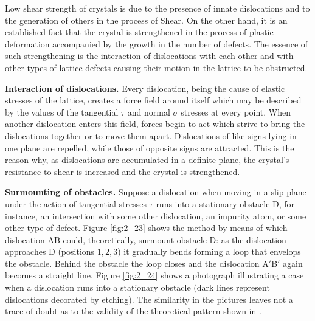 Low shear strength of crystals is due to the presence of innate dislocations and to the generation of others in the process of Shear. On the other hand, it is an established fact that the crystal is strengthened in the process of plastic deformation accompanied by the growth in the number of defects. The essence of such strengthening is the interaction of dislocations with each other and with other types of lattice defects causing their motion in the lattice to be obstructed.

\textbf{Interaction of dislocations.} Every dislocation, being the cause of elastic stresses of the lattice, creates a force field around itself which may be described by the values of the tangential $\tau$ and normal $\sigma$ stresses at every point. When another dislocation enters this field, forces begin to act which strive to bring the dislocations together or to move them apart. Dislocations of like signs lying in one plane are repelled, while those of opposite signs are attracted. This is the reason why, as dislocations are accumulated in a definite plane, the crystal's resistance to shear is increased and the crystal is strengthened.

\textbf{Surmounting of obstacles.} Suppose a dislocation when moving in a slip plane under the action of tangential stresses $\tau$ runs into a stationary obstacle D, for instance, an intersection with some other dislocation, an impurity atom, or some other type of defect. Figure \ref{fig:2_23} shows the method by means of which dislocation AB could, theoretically, surmount obstacle D: as the dislocation approaches D (positions $1, 2, 3$) it gradually bends forming a loop that envelops the obstacle. Behind the obstacle the loop closes and the dislocation A$'$B$'$ again becomes a straight line. Figure \ref{fig:2_24} shows a photograph illustrating a case when a dislocation runs into a stationary obstacle (dark lines represent dislocations decorated by etching). The similarity in the pictures leaves not a trace of doubt as to the validity of the theoretical pattern shown in .

